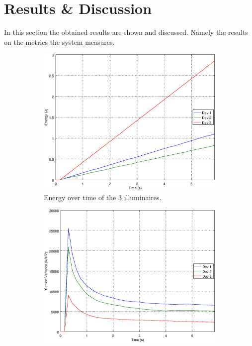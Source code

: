 \section{Results \& Discussion}\label{results}


In this section the obtained results are shown and discussed. Namely the results on the metrics the system measures.

\begin{figure}[ht]
    \centering
    \begin{subfigure}[t]{0.3\textwidth}
    \centering
    \includegraphics[width=.95\textwidth]{img/e_closed_o000}
    \caption{Energy over time of the 3 illuminaires.}
    \label{fig:e_closed_o000}
    \end{subfigure}
    \begin{subfigure}[t]{0.3\textwidth}
    \centering
    \includegraphics[width=.95\textwidth]{img/f_closed_o000}

\end{subfigure}
\end{figure}
